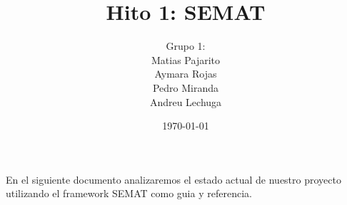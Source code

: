 \documentclass{article}
\title{Hito 1: SEMAT}
\author{
    Grupo 1: \\
    Matias Pajarito \\
    Aymara Rojas \\
    Pedro Miranda \\
    Andreu Lechuga\\
    }
\date{\today}
\begin{document}
\maketitle

En el siguiente documento analizaremos el estado actual de nuestro proyecto 
utilizando el framework SEMAT como guia y referencia.
\end{document}
